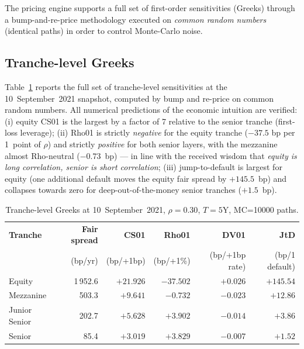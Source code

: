 \documentclass[11pt,a4paper]{article}
\newcommand{\1}{\mathbf{1}}
\begin{document}
The pricing engine supports a full set of first-order sensitivities
(Greeks) through a bump-and-re-price methodology executed on
\emph{common random numbers} (identical paths) in order to control
Monte-Carlo noise.

\subsection{Tranche-level Greeks}
Table~\ref{tab:greeks} reports the full set of tranche-level
sensitivities at the 10~September~2021 snapshot, computed by bump
and re-price on common random numbers. All numerical predictions of
the economic intuition are verified:
(i) equity CS01 is the largest by a factor of 7 relative to the
senior tranche (first-loss leverage);
(ii) Rho01 is strictly \emph{negative} for the equity tranche
(\(-37.5\) bp per 1~point of \(\rho\)) and strictly \emph{positive}
for both senior layers, with the mezzanine almost Rho-neutral
(\(-0.73\)~bp) --- in line with the received wisdom that
\emph{equity is long correlation, senior is short correlation};
(iii) jump-to-default is largest for equity (one additional default
moves the equity fair spread by \(+145.5\)~bp) and collapses
towards zero for deep-out-of-the-money senior tranches (\(+1.5\)~bp).

\begin{table}[H]
\centering
\caption{Tranche-level Greeks at 10~September~2021,
\(\rho=0.30\), \(T=5\)Y, MC=\num{10000} paths.}
\label{tab:greeks}
\setlength{\tabcolsep}{8pt}
\begin{tabular}{l r r r r r}
\toprule
\textbf{Tranche} & \textbf{Fair spread} & \textbf{CS01}
& \textbf{Rho01} & \textbf{DV01} & \textbf{JtD}\\
 & (bp/yr) & (bp/+1bp) & (bp/+1\%) & (bp/+1bp rate) & (bp/1 default)\\
\midrule
Equity        & 1\,952.6 & $+21.926$ & $-37.502$ & $+0.026$ & $+145.54$\\
Mezzanine     &   503.3 & $+9.641$  & $-0.732$  & $-0.023$ & $+12.86$\\
Junior Senior &   202.7 & $+5.628$  & $+3.902$  & $-0.014$ & $+3.86$\\
Senior        &    85.4 & $+3.019$  & $+3.829$  & $-0.007$ & $+1.52$\\
\bottomrule
\end{tabular}
\end{table}
\end{document}
